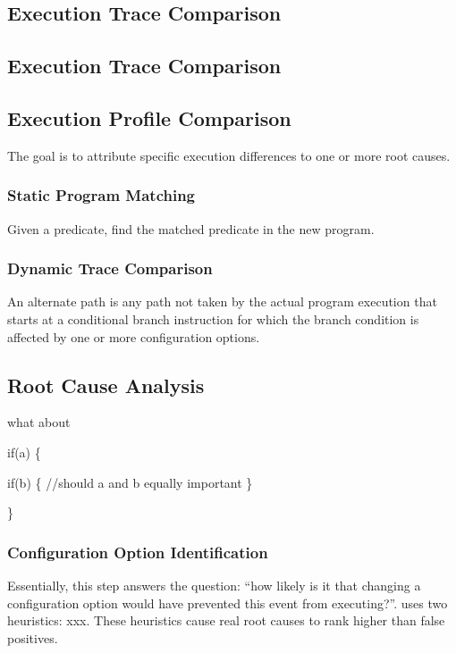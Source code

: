 \subsection{Execution Trace Comparison}
\label{sec:comparison}

\subsection{Execution Trace Comparison}
\label{sec:rootcause}

\subsection{Execution Profile Comparison}

The goal is to attribute specific execution differences
to one or more root causes.

\subsubsection{Static Program Matching}

Given a predicate, find the matched predicate in the
new program.



\subsubsection{Dynamic Trace Comparison}

An alternate path is any path not taken by the actual
program execution that starts at a conditional
branch instruction for which the branch condition
is affected by one or more configuration options.

\subsection{Root Cause Analysis}

what about 

if(a) \{

    if(b) \{
        //should a and b equally important
     \}

    \}

\subsubsection{Configuration Option Identification}

Essentially, this step answers the question:
``how likely is it that changing a configuration
option would have prevented this event
from executing?''.
\ourtool uses two heuristics: xxx.
These heuristics cause real root causes to rank
higher than false positives.


